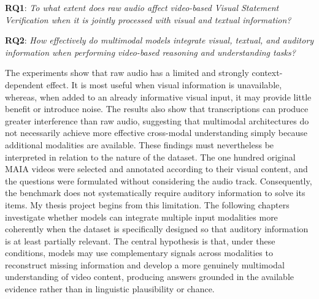 \textbf{RQ1}: \textit{To what extent does raw audio affect video-based Visual Statement Verification when it is jointly processed with visual and textual information?}

\textbf{RQ2}: \textit{How effectively do multimodal models integrate visual, textual, and auditory information when performing video-based reasoning and understanding tasks?}

The experiments show that raw audio has a limited and strongly context-dependent effect. It is most useful when visual information is unavailable, whereas, when added to an already
informative visual input, it may provide little benefit or introduce noise. The results also show that transcriptions can produce greater interference than raw audio, suggesting 
that multimodal architectures do not necessarily achieve more effective cross-modal understanding simply because additional modalities are available.
These findings must nevertheless be interpreted in relation to the nature of the dataset. The one hundred original MAIA videos were selected and annotated according to their 
visual content, and the questions were formulated without considering the audio track. Consequently, the benchmark does not systematically require auditory information to solve its items.
My thesis project begins from this limitation. The following chapters investigate whether models can integrate multiple input modalities more coherently when the dataset 
is specifically designed so that auditory information is at least partially relevant. The central hypothesis is that, under these conditions, models may use complementary 
signals across modalities to reconstruct missing information and develop a more genuinely multimodal understanding of video content, producing answers grounded in the available 
evidence rather than in linguistic plausibility or chance.
